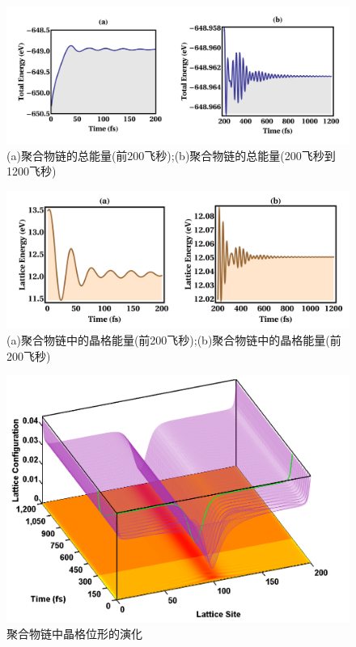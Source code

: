 \documentclass[12pt,]{report}
\begin{document}
\begin{figure}[h!] 
    \centering
    \includegraphics[scale=1]{./figures/Exciton_Figure_7.png}
    \caption{(a)聚合物链的总能量(前200飞秒);(b)聚合物链的总能量(200飞秒到1200飞秒)}
    \label{fig:total_energy}
\end{figure}

\begin{figure}[h!] 
    \centering
    \includegraphics[scale=1]{./figures/Exciton_Figure_8.png}
    \caption{(a)聚合物链中的晶格能量(前200飞秒);(b)聚合物链中的晶格能量(前200飞秒)}
    \label{fig:lattice_energy}
\end{figure}

\begin{figure}[h!] 
    \centering
    \includegraphics[scale=0.4]{./figures/Exciton_Figure_13.png}
    \caption{聚合物链中晶格位形的演化}
    \label{fig:3dl_config}
\end{figure}
\end{document}
